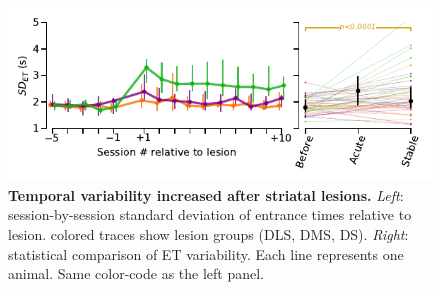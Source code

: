\begin{figure}[!h]
  \begin{center}
    \includegraphics[scale=1]{ch-appendicies/figures/SDofET.pdf}
    \caption[Temporal Variability After Lesion]
    {\textbf{Temporal variability increased after striatal lesions.}
    \textit{Left}: session-by-session standard deviation of entrance times relative to lesion.
    colored traces show lesion groups (DLS, DMS, DS).
    \textit{Right}: statistical comparison of ET variability.
    Each line represents one animal.
    Same color-code as the left panel.
    }
    \label{fig:appendix:SdofET}
  \end{center}
\end{figure}